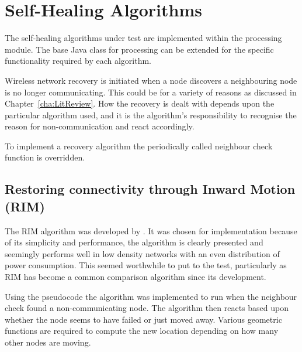 \documentclass[authoryearcitations]{UoYCSproject}
\begin{document}
\section{Self-Healing Algorithms}

The self-healing algorithms under test are implemented within the processing module. The base Java class for processing can be extended for the specific functionality required by each algorithm.

Wireless network recovery is initiated when a node discovers a neighbouring node is no longer communicating. This could be for a variety of reasons as discussed in Chapter~\ref{cha:LitReview}. How the recovery is dealt with depends upon the particular algorithm used, and it is the algorithm's responsibility to recognise the reason for non-communication and react accordingly.

To implement a recovery algorithm the periodically called neighbour check function is overridden.

\subsection{Restoring connectivity through Inward Motion (RIM)}

The RIM algorithm was developed by \citet*{Younis2010}. It was chosen for implementation because of its simplicity and performance, the algorithm is clearly presented and seemingly performs well in low density networks with an even distribution of power consumption. This seemed worthwhile to put to the test, particularly as RIM has become a common comparison algorithm since its development.

Using the pseudocode the algorithm was implemented to run when the neighbour check found a non-communicating node. The algorithm then reacts based upon whether the node seems to have failed or just moved away. Various geometric functions are required to compute the new location depending on how many other nodes are moving.
\end{document}
